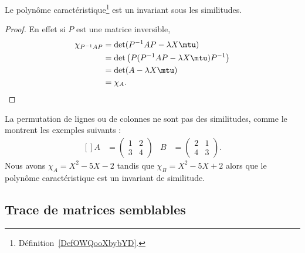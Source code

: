 \begin{lemma}       \label{LEMooKUHJooDfNKeg}
	Le polynôme caractéristique\footnote{Définition~\ref{DefOWQooXbybYD}.} est un invariant sous les similitudes.
\end{lemma}

\begin{proof}
	En effet si \( P\) est une matrice inversible,
	\begin{subequations}
		\begin{align}
			\chi_{P^{-1}AP} & = \det(P^{-1}AP-\lambda X\mtu)                    \\
			                & = \det\big( P(P^{-1}AP-\lambda X\mtu)P^{-1} \big) \\
			                & = \det(A-\lambda X\mtu)                           \\
			                & = \chi_A.
		\end{align}
	\end{subequations}
\end{proof}

La permutation de lignes ou de colonnes ne sont pas des similitudes, comme le montrent les exemples suivants :
\begin{equation}
	\begin{aligned}[]
		A & =\begin{pmatrix}
			     1 & 2 \\
			     3 & 4
		     \end{pmatrix} &
		B & =\begin{pmatrix}
			     2 & 1 \\
			     4 & 3
		     \end{pmatrix}.
	\end{aligned}
\end{equation}
Nous avons \( \chi_A=X^2-5X-2\) tandis que \( \chi_B=X^2-5X+2\) alors que le polynôme caractéristique est un invariant de similitude.

\subsection{Trace de matrices semblables}

